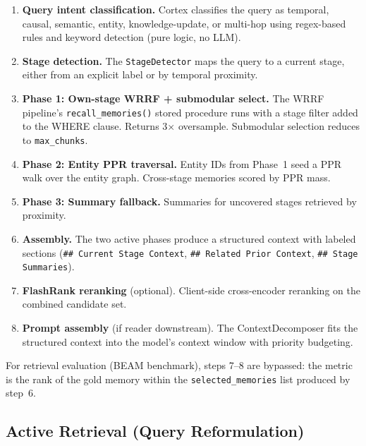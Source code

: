 \documentclass[11pt]{article}
\begin{document}
\begin{enumerate}
  \item \textbf{Query intent classification.}  Cortex classifies the
    query as temporal, causal, semantic, entity, knowledge-update, or
    multi-hop using regex-based rules and keyword detection (pure
    logic, no LLM).

  \item \textbf{Stage detection.}  The \texttt{StageDetector} maps
    the query to a current stage, either from an explicit label or by
    temporal proximity.

  \item \textbf{Phase 1: Own-stage WRRF + submodular select.}  The
    WRRF pipeline's \texttt{recall\_memories()} stored procedure runs
    with a stage filter added to the WHERE clause.  Returns
    3$\times$ oversample.  Submodular selection reduces to
    \texttt{max\_chunks}.

  \item \textbf{Phase 2: Entity PPR traversal.}  Entity IDs from
    Phase~1 seed a PPR walk over the entity graph.  Cross-stage
    memories scored by PPR mass.

  \item \textbf{Phase 3: Summary fallback.}  Summaries for uncovered
    stages retrieved by proximity.

  \item \textbf{Assembly.}  The two active phases produce a structured
    context with labeled sections (\texttt{\#\# Current Stage Context},
    \texttt{\#\# Related Prior Context},
    \texttt{\#\# Stage Summaries}).

  \item \textbf{FlashRank reranking} (optional).  Client-side
    cross-encoder reranking on the combined candidate set.

  \item \textbf{Prompt assembly} (if reader downstream).  The
    ContextDecomposer fits the structured context into the model's
    context window with priority budgeting.
\end{enumerate}

For retrieval evaluation (BEAM benchmark), steps 7--8 are bypassed:
the metric is the rank of the gold memory within the
\texttt{selected\_memories} list produced by step~6.

\subsection{Active Retrieval (Query Reformulation)}
\label{sec:active-retrieval}
\end{document}
